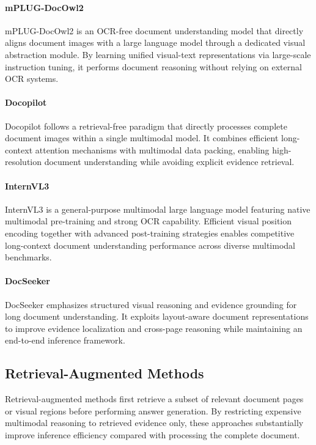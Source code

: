 \documentclass[letterpaper]{article} %
\begin{document}
\paragraph{mPLUG-DocOwl2}

mPLUG-DocOwl2 is an OCR-free document understanding model that directly aligns document images with a large language model through a dedicated visual abstraction module. By learning unified visual-text representations via large-scale instruction tuning, it performs document reasoning without relying on external OCR systems.

\paragraph{Docopilot}

Docopilot follows a retrieval-free paradigm that directly processes complete document images within a single multimodal model. It combines efficient long-context attention mechanisms with multimodal data packing, enabling high-resolution document understanding while avoiding explicit evidence retrieval.

\paragraph{InternVL3}

InternVL3 is a general-purpose multimodal large language model featuring native multimodal pre-training and strong OCR capability. Efficient visual position encoding together with advanced post-training strategies enables competitive long-context document understanding performance across diverse multimodal benchmarks.

\paragraph{DocSeeker}

DocSeeker emphasizes structured visual reasoning and evidence grounding for long document understanding. It exploits layout-aware document representations to improve evidence localization and cross-page reasoning while maintaining an end-to-end inference framework.




\subsection{Retrieval-Augmented Methods}

Retrieval-augmented methods first retrieve a subset of relevant document pages or visual regions before performing answer generation. By restricting expensive multimodal reasoning to retrieved evidence only, these approaches substantially improve inference efficiency compared with processing the complete document.
\end{document}
